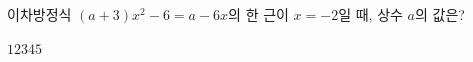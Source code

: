 이차방정식 $(a+3)x^2-6=a-6x$의 한 근이 $x=-2$일 때, 상수 $a$의 값은?
\begin{choices32}{$1$}{$2$}{$3$}{$4$}{$5$}\end{choices32}
